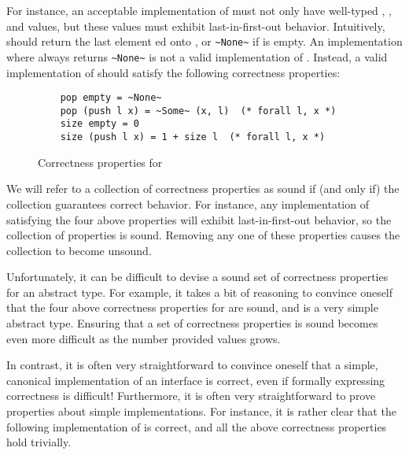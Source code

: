 \documentclass[12pt]{article}
\begin{document}
  \bigskip

  \noindent For instance, an acceptable implementation of  must not only have well-typed , ,  and  values, but these values must exhibit last-in-first-out behavior. Intuitively,  should return the last element ed onto , or \lstinline{~None~} if  is empty. An implementation where  always returns \lstinline{~None~} is not a valid implementation of . Instead, a valid implementation of  should satisfy the following correctness properties:

  \begin{figure}[H]
    \begin{lstlisting}
    pop empty = ~None~
    pop (push l x) = ~Some~ (x, l)  (* forall l, x *)
    size empty = 0
    size (push l x) = 1 + size l  (* forall l, x *)
    \end{lstlisting}
    \caption{Correctness properties for }
  \end{figure}

  \noindent We will refer to a collection of correctness properties as sound if (and only if) the collection guarantees correct behavior. For instance, any implementation of  satisfying the four above properties will exhibit last-in-first-out behavior, so the collection of properties is sound. Removing any one of these properties causes the collection to become unsound.

  \bigskip

  \noindent Unfortunately, it can be difficult to devise a sound set of correctness properties for an abstract type. For example, it takes a bit of reasoning to convince oneself that the four above correctness properties for  are sound, and  is a very simple abstract type. Ensuring that a set of correctness properties is sound becomes even more difficult as the number provided values grows.

  \bigskip

  \noindent In contrast, it is often very straightforward to convince oneself that a simple, canonical implementation of an interface is correct, even if formally expressing correctness is difficult! Furthermore, it is often very straightforward to prove properties about simple implementations. For instance, it is rather clear that the following implementation of  is correct, and all the above correctness properties hold trivially.
\end{document}
